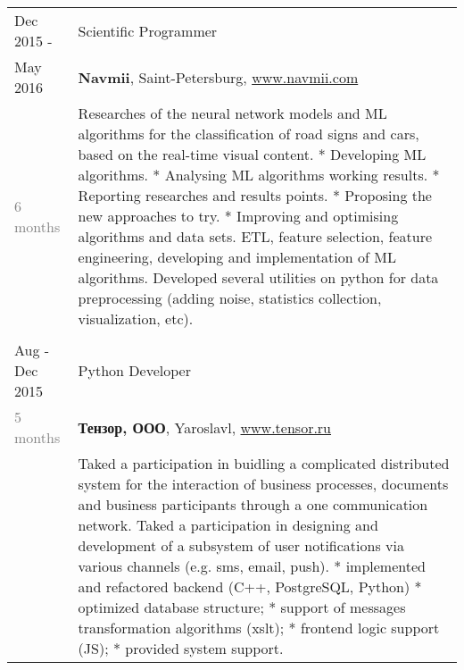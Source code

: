 \documentclass[a4paper,10pt]{article}
\begin{document}
\begin{tabularx}{\textwidth}{lX}
	Dec 2015 -				&	Scientific Programmer \\
	May 2016				&	\textbf{Navmii}, Saint-Petersburg,
								\href{www.navmii.com}{www.navmii.com} \\
	\textcolor{gray}
	{6 months}
							&	\footnotesize{
									Researches of the neural network models and ML algorithms for the classification of road signs and cars, based on the real-time visual content.\newline
									* Developing ML algorithms.\newline
									* Analysing ML algorithms working results.\newline
									* Reporting researches and results points.\newline
									* Proposing the new approaches to try.\newline
									* Improving and optimising algorithms and data sets.\newline\newline
									ETL, feature selection, feature engineering, developing and implementation of ML
									algorithms.\newline
									Developed several utilities on python for data preprocessing (adding noise,
									statistics collection, visualization, etc).\newline
								} \\

	\multicolumn{2}{c}{}\\	

	Aug - Dec 2015			&	Python Developer\\
	\textcolor{gray}
	{5 months}		
							&	\textbf{Тензор, ООО}, Yaroslavl,
								\href{www.tensor.ru}{www.tensor.ru} \\
							&	\footnotesize{
									Taked a participation in buidling a complicated distributed system for the interaction of business processes, documents and business participants through a one communication network.\newline\newline
									Taked a participation in designing and development of a subsystem of user
									notifications via various channels (e.g. sms, email, push).\newline
									* implemented and refactored backend (C++, PostgreSQL, Python)\newline
									* optimized database structure;\newline
									* support of messages transformation algorithms (xslt);\newline
									* frontend logic support (JS);\newline
									* provided system support.\newline
								} \\
	

\end{tabularx}
\end{document}
